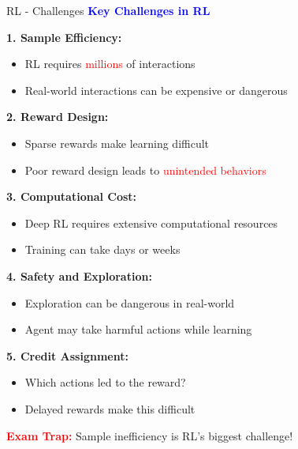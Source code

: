 \documentclass[8pt]{beamer}
\begin{document}
	\begin{frame}{RL - Challenges}
		\fontsize{6.5}{7.5}\selectfont
		\textcolor{blue}{\textbf{Key Challenges in RL}}
		
		\textbf{1. Sample Efficiency:}
		\begin{itemize}
			\item RL requires \textcolor{red}{millions} of interactions
			\item Real-world interactions can be expensive or dangerous
		\end{itemize}
		
		\textbf{2. Reward Design:}
		\begin{itemize}
			\item Sparse rewards make learning difficult
			\item Poor reward design leads to \textcolor{red}{unintended behaviors}
		\end{itemize}
		
		\textbf{3. Computational Cost:}
		\begin{itemize}
			\item Deep RL requires extensive computational resources
			\item Training can take days or weeks
		\end{itemize}
		
		\textbf{4. Safety and Exploration:}
		\begin{itemize}
			\item Exploration can be dangerous in real-world
			\item Agent may take harmful actions while learning
		\end{itemize}
		
		\textbf{5. Credit Assignment:}
		\begin{itemize}
			\item Which actions led to the reward?
			\item Delayed rewards make this difficult
		\end{itemize}
		
		\textcolor{red}{\textbf{Exam Trap:}} Sample inefficiency is RL's biggest challenge!
	\end{frame}
	
\end{document}
